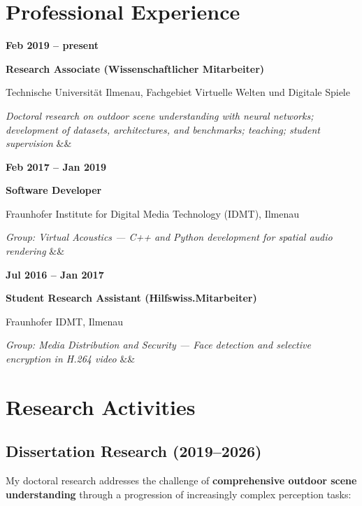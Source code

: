 \documentclass[11pt,a4paper]{article}
\newcommand{\cventryFull}[5]{%
  \par\noindent
  \begin{minipage}[t]{3.5cm}\raggedright\textbf{#1}\end{minipage}%
  \hfill
  \begin{minipage}[t]{\dimexpr\textwidth-3.8cm\relax}%
    \textbf{#2}\par #3\par\textit{#4}%
    \ifx&#5&\else\par #5\fi
  \end{minipage}%
  \par\vspace{8pt}%
}
\begin{document}
\section*{Professional Experience}

\cventryFull{Feb 2019 -- present}
  {Research Associate (Wissenschaftlicher Mitarbeiter)}
  {Technische Universit\"at Ilmenau, Fachgebiet Virtuelle Welten und Digitale Spiele}
  {Doctoral research on outdoor scene understanding with neural networks;
   development of datasets, architectures, and benchmarks; teaching; student supervision}
  {}

\cventryFull{Feb 2017 -- Jan 2019}
  {Software Developer}
  {Fraunhofer Institute for Digital Media Technology (IDMT), Ilmenau}
  {Group: Virtual Acoustics --- C++ and Python development for spatial audio rendering}
  {}

\cventryFull{Jul 2016 -- Jan 2017}
  {Student Research Assistant (Hilfswiss.\@ Mitarbeiter)}
  {Fraunhofer IDMT, Ilmenau}
  {Group: Media Distribution and Security --- Face detection and selective encryption in H.264 video}
  {}

\section*{Research Activities}

\subsection*{Dissertation Research (2019--2026)}

\noindent
My doctoral research addresses the challenge of \textbf{comprehensive outdoor scene
understanding} through a progression of increasingly complex perception tasks:
\end{document}
